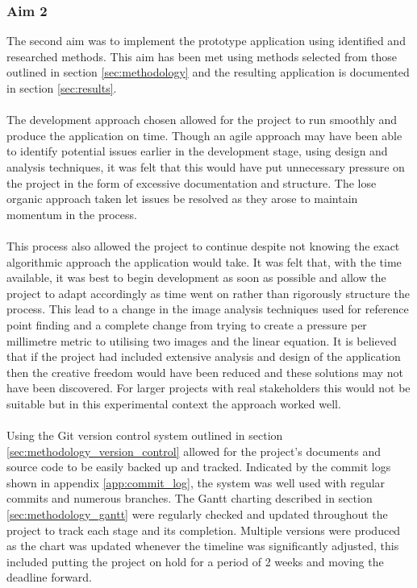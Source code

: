 		\subsubsection{Aim 2}
			The second aim was to implement the prototype application using identified and researched methods. This aim has been met using methods selected from those outlined in section \ref{sec:methodology} and the resulting application is documented in section \ref{sec:results}.
			\\\\
			The development approach chosen allowed for the project to run smoothly and produce the application on time. Though an agile approach may have been able to identify potential issues earlier in the development stage, using design and analysis techniques, it was felt that this would have put unnecessary pressure on the project in the form of excessive documentation and structure. The lose organic approach taken let issues be resolved as they arose to maintain momentum in the process. 
			\\\\
			This process also allowed the project to continue despite not knowing the exact algorithmic approach the application would take. It was felt that, with the time available, it was best to begin development as soon as possible and allow the project to adapt accordingly as time went on rather than rigorously structure the process. This lead to a change in the image analysis techniques used for reference point finding and a complete change from trying to create a pressure per millimetre metric to utilising two images and the linear equation. It is believed that if the project had included extensive analysis and design of the application then the creative freedom would have been reduced and these solutions may not have been discovered. For larger projects with real stakeholders this would not be suitable but in this experimental context the approach worked well.
			\\\\
			Using the Git version control system outlined in section \ref{sec:methodology_version_control} allowed for the project's documents and source code to be easily backed up and tracked. Indicated by the commit logs shown in appendix \ref{app:commit_log}, the system was well used with regular commits and numerous branches. The Gantt charting described in section \ref{sec:methodology_gantt} were regularly checked and updated throughout the project to track each stage and its completion. Multiple versions were produced as the chart was updated whenever the timeline was significantly adjusted, this included putting the project on hold for a period of 2 weeks and moving the deadline forward.
